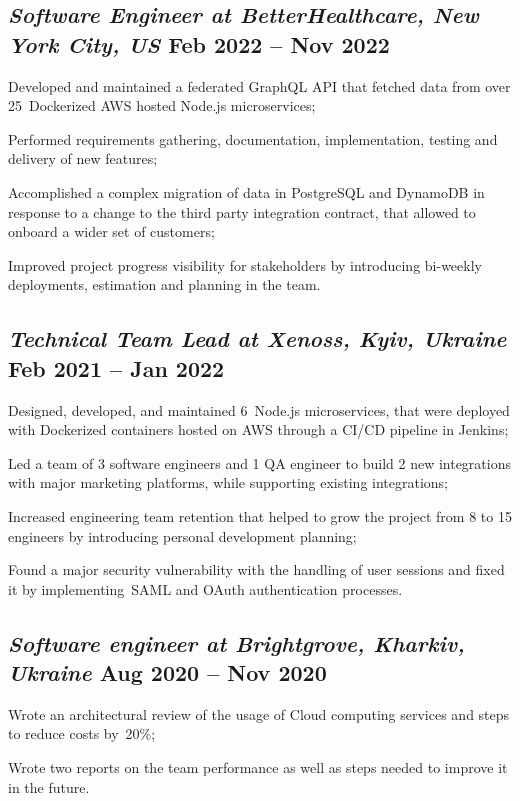 \documentclass[a4paper,12pt]{book}
\begin{document}
\subsection{{\sl\bf\hspace{0.1in}Software Engineer at BetterHealthcare,  New York City, US} \hfill Feb 2022 -- Nov 2022}
\begin{zitemize}
\item Developed and maintained a federated GraphQL API that fetched data from over 25~Dockerized AWS hosted Node.js microservices;
\item Performed requirements gathering, documentation, implementation, testing and delivery of new features;
\item Accomplished a complex migration of data in PostgreSQL and DynamoDB in response to a change to the third party integration contract, that allowed to onboard a wider set of customers; 
\item Improved project progress visibility for stakeholders by introducing bi-weekly deployments, estimation and planning in the team.
\end{zitemize}

\subsection{{\sl\bf\hspace{0.1in}Technical Team Lead at Xenoss, Kyiv, Ukraine } \hfill Feb 2021 -- Jan 2022}
\begin{zitemize}
 \item Designed, developed, and maintained 6~Node.js microservices, that were deployed with Dockerized containers hosted on AWS through a CI/CD pipeline in Jenkins;
 \item Led a team of 3 software engineers and 1 QA engineer to build 2 new integrations with major marketing platforms, while supporting existing integrations;
 \item Increased engineering team retention that helped to grow the project from 8 to 15 engineers by introducing personal development planning;
 \item Found a major security vulnerability with the handling of user sessions and fixed it by implementing~SAML and OAuth authentication processes.
\end{zitemize}

\subsection{{\sl\bf\hspace{0.1in}Software engineer at Brightgrove, Kharkiv, Ukraine } \hfill Aug 2020 -- Nov 2020}
\begin{zitemize}
 \item Wrote an architectural review of the usage of Cloud computing services and steps to reduce costs by~20\%;
 \item Wrote two reports on the team performance as well as steps needed to improve it in the future.
\end{zitemize}
\end{document}

